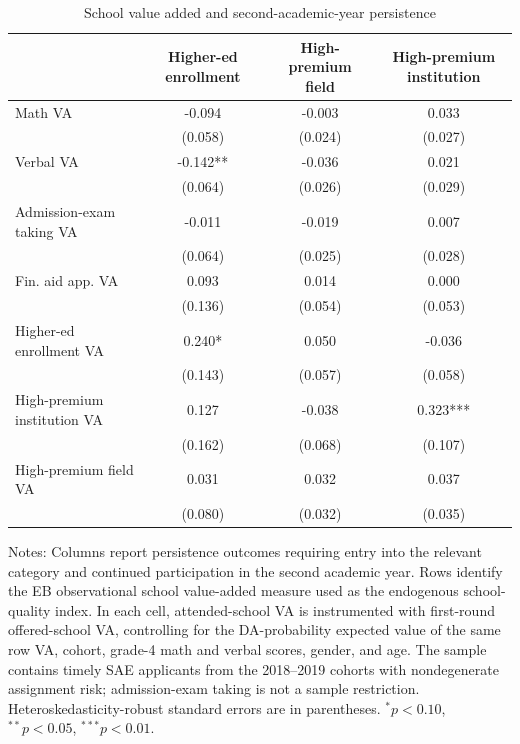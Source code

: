 \begin{table}[!htbp]
\centering
\caption{School value added and second-academic-year persistence}
\label{tab:va-higher-ed-persistence-cross-va}
\begin{threeparttable}
\begin{tabular}{lccc}
\toprule
 & Higher-ed enrollment & High-premium field & High-premium institution \\
\midrule
Math VA & -0.094 & -0.003 & 0.033 \\
 & (0.058) & (0.024) & (0.027) \\
Verbal VA & -0.142** & -0.036 & 0.021 \\
 & (0.064) & (0.026) & (0.029) \\
Admission-exam taking VA & -0.011 & -0.019 & 0.007 \\
 & (0.064) & (0.025) & (0.028) \\
\midrule
Fin. aid app. VA & 0.093 & 0.014 & 0.000 \\
 & (0.136) & (0.054) & (0.053) \\
Higher-ed enrollment VA & 0.240* & 0.050 & -0.036 \\
 & (0.143) & (0.057) & (0.058) \\
High-premium institution VA & 0.127 & -0.038 & 0.323*** \\
 & (0.162) & (0.068) & (0.107) \\
High-premium field VA & 0.031 & 0.032 & 0.037 \\
 & (0.080) & (0.032) & (0.035) \\
\bottomrule
\end{tabular}
\begin{tablenotes}[flushleft]
\footnotesize
\item Notes: Columns report persistence outcomes requiring entry into the relevant category and continued participation in the second academic year. Rows identify the EB observational school value-added measure used as the endogenous school-quality index. In each cell, attended-school VA is instrumented with first-round offered-school VA, controlling for the DA-probability expected value of the same row VA, cohort, grade-4 math and verbal scores, gender, and age. The sample contains timely SAE applicants from the 2018--2019 cohorts with nondegenerate assignment risk; admission-exam taking is not a sample restriction. Heteroskedasticity-robust standard errors are in parentheses. $^{*}p<0.10$, $^{**}p<0.05$, $^{***}p<0.01$.
\end{tablenotes}
\end{threeparttable}
\end{table}
